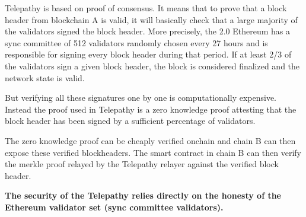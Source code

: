 Telepathy is based on proof of consensus. It means that to prove that a block header from blockchain A is valid, it will basically check that a large majority of the validators signed the block header. 
More precisely, the 2.0 Ethereum has a sync committee of 512 validators randomly chosen every 27 hours and is responsible for signing every block header during that period. If at least 2/3 of the validators sign a given block header, the block is considered finalized and the network state is valid. 

But verifying all these signatures one by one is computationally expensive. Instead the proof used in Telepathy is a zero knowledge proof attesting that the block header has been signed by a sufficient percentage of validators. 

The zero knowledge proof can be cheaply verified onchain and chain B can then expose these verified blockheaders.
The smart contract in chain B can then verify the merkle proof relayed by the Telepathy relayer against the verified block header.

 

\textbf{The security of the Telepathy relies directly on the honesty of the Ethereum validator set (sync committee validators).
}


